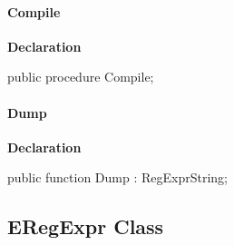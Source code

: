 \documentclass{report}
\newif\ifpdf
\begin{document}
\paragraph*{Compile}\hspace*{\fill}

\label{RegExpr.TRegExpr-Compile}
\begin{list}{}{
\setlength{\itemindent}{0cm}
\setlength{\listparindent}{0cm}
\setlength{\leftmargin}{\evensidemargin}
\addtolength{\leftmargin}{\tmplength}
\settowidth{\labelsep}{X}
\addtolength{\leftmargin}{\labelsep}
\setlength{\labelwidth}{\tmplength}
}
\item[\textbf{Declaration}\hfill]
\ifpdf
\begin{flushleft}
\fi
\begin{ttfamily}
public procedure Compile;\end{ttfamily}

\ifpdf
\end{flushleft}
\fi

\end{list}
\paragraph*{Dump}\hspace*{\fill}

\label{RegExpr.TRegExpr-Dump}
\begin{list}{}{
\setlength{\itemindent}{0cm}
\setlength{\listparindent}{0cm}
\setlength{\leftmargin}{\evensidemargin}
\addtolength{\leftmargin}{\tmplength}
\settowidth{\labelsep}{X}
\addtolength{\leftmargin}{\labelsep}
\setlength{\labelwidth}{\tmplength}
}
\item[\textbf{Declaration}\hfill]
\ifpdf
\begin{flushleft}
\fi
\begin{ttfamily}
public function Dump : RegExprString;\end{ttfamily}

\ifpdf
\end{flushleft}
\fi

\end{list}
\ifpdf
\subsection*{\large{\textbf{ERegExpr Class}}\normalsize\hspace{1ex}\hrulefill}
\else
\subsection*{ERegExpr Class}
\fi
\label{RegExpr.ERegExpr}
\end{document}
